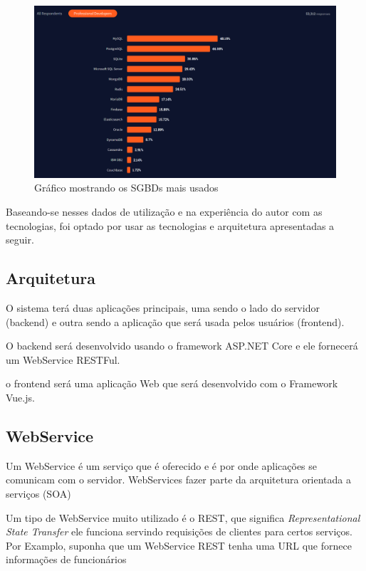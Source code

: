 \documentclass[12pt]{article}
\begin{document}
\begin{figure}[H]
  \centering
  \includegraphics[width=1\textwidth]{databases.png}
  \caption{Gráfico mostrando os SGBDs mais usados}\label{fig:databases}
\end{figure}

Baseando-se nesses dados de utilização e na experiência do autor com as tecnologias, foi optado por usar as tecnologias e arquitetura
apresentadas a seguir.

\subsection{Arquitetura}

O sistema terá duas aplicações principais, uma sendo o lado do servidor (backend) e outra sendo
a aplicação que será usada pelos usuários (frontend).

O backend será desenvolvido usando o framework ASP.NET Core e
ele fornecerá um WebService RESTFul.

o frontend será uma aplicação Web que será desenvolvido com o Framework Vue.js.

\subsection{WebService}

Um WebService é um serviço que é oferecido e é por onde aplicações se comunicam com o servidor.
WebServices fazer parte da arquitetura orientada a serviços (SOA)

Um tipo de WebService muito utilizado é o REST, que significa
\emph{Representational State Transfer} ele funciona servindo requisições de clientes
para certos serviços. Por Examplo, suponha que um WebService REST tenha uma URL que fornece
informações de funcionários
\end{document}
